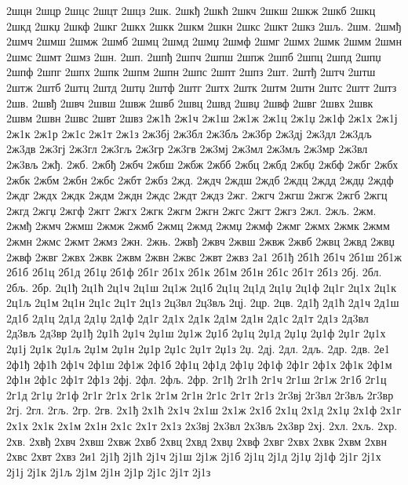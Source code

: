 {2шцн
2шцр
2шцс
2шцт
2шцз
2шк.
2шкђ
2шкћ
2шкч
2шкш
2шкж
2шкб
2шкц
2шкд
2шкџ
2шкф
2шкг
2шкх
2шкк
2шкм
2шкн
2шкс
2шкт
2шкз
2шљ.
2шм.
2шмђ
2шмч
2шмш
2шмж
2шмб
2шмц
2шмд
2шмџ
2шмф
2шмг
2шмх
2шмк
2шмм
2шмн
2шмс
2шмт
2шмз
2шн.
2шп.
2шпђ
2шпч
2шпш
2шпж
2шпб
2шпц
2шпд
2шпџ
2шпф
2шпг
2шпх
2шпк
2шпм
2шпн
2шпс
2шпт
2шпз
2шт.
2штђ
2штч
2штш
2штж
2штб
2штц
2штд
2штџ
2штф
2штг
2штх
2штк
2штм
2штн
2штс
2штт
2штз
2шв.
2швђ
2швч
2швш
2швж
2швб
2швц
2швд
2швџ
2швф
2швг
2швх
2швк
2швм
2швн
2швс
2швт
2швз
2ж1ћ
2ж1ч
2ж1ш
2ж1ж
2ж1ц
2ж1џ
2ж1ф
2ж1х
2ж1ј
2ж1к
2ж1р
2ж1с
2ж1т
2ж1з
2ж3бј
2ж3бл
2ж3бљ
2ж3бр
2ж3дј
2ж3дл
2ж3дљ
2ж3дв
2ж3гј
2ж3гл
2ж3гљ
2ж3гр
2ж3гв
2ж3мј
2ж3мл
2ж3мљ
2ж3мр
2ж3вл
2ж3вљ
2жђ.
2жб.
2жбђ
2жбч
2жбш
2жбж
2жбб
2жбц
2жбд
2жбџ
2жбф
2жбг
2жбх
2жбк
2жбм
2жбн
2жбс
2жбт
2жбз
2жд.
2ждч
2ждш
2ждб
2ждц
2ждд
2ждџ
2ждф
2ждг
2ждх
2ждк
2ждм
2ждн
2ждс
2ждт
2ждз
2жг.
2жгч
2жгш
2жгж
2жгб
2жгц
2жгд
2жгџ
2жгф
2жгг
2жгх
2жгк
2жгм
2жгн
2жгс
2жгт
2жгз
2жл.
2жљ.
2жм.
2жмђ
2жмч
2жмш
2жмж
2жмб
2жмц
2жмд
2жмџ
2жмф
2жмг
2жмх
2жмк
2жмм
2жмн
2жмс
2жмт
2жмз
2жн.
2жњ.
2жвђ
2жвч
2жвш
2жвж
2жвб
2жвц
2жвд
2жвџ
2жвф
2жвг
2жвх
2жвк
2жвм
2жвн
2жвс
2жвт
2жвз
2а1
2б1ђ
2б1ћ
2б1ч
2б1ш
2б1ж
2б1б
2б1ц
2б1д
2б1џ
2б1ф
2б1г
2б1х
2б1к
2б1м
2б1н
2б1с
2б1т
2б1з
2бј.
2бл.
2бљ.
2бр.
2ц1ђ
2ц1ћ
2ц1ч
2ц1ш
2ц1ж
2ц1б
2ц1ц
2ц1д
2ц1џ
2ц1ф
2ц1г
2ц1х
2ц1к
2ц1љ
2ц1м
2ц1н
2ц1с
2ц1т
2ц1з
2ц3вл
2ц3вљ
2цј.
2цр.
2цв.
2д1ђ
2д1ћ
2д1ч
2д1ш
2д1б
2д1ц
2д1д
2д1џ
2д1ф
2д1г
2д1х
2д1к
2д1м
2д1н
2д1с
2д1т
2д1з
2д3вл
2д3вљ
2д3вр
2џ1ђ
2џ1ћ
2џ1ч
2џ1ш
2џ1ж
2џ1б
2џ1ц
2џ1д
2џ1џ
2џ1ф
2џ1г
2џ1х
2џ1ј
2џ1к
2џ1љ
2џ1м
2џ1н
2џ1р
2џ1с
2џ1т
2џ1з
2џ.
2дј.
2дл.
2дљ.
2др.
2дв.
2е1
2ф1ђ
2ф1ћ
2ф1ч
2ф1ш
2ф1ж
2ф1б
2ф1ц
2ф1д
2ф1џ
2ф1ф
2ф1г
2ф1х
2ф1к
2ф1м
2ф1н
2ф1с
2ф1т
2ф1з
2фј.
2фл.
2фљ.
2фр.
2г1ђ
2г1ћ
2г1ч
2г1ш
2г1ж
2г1б
2г1ц
2г1д
2г1џ
2г1ф
2г1г
2г1х
2г1к
2г1м
2г1н
2г1с
2г1т
2г1з
2г3вј
2г3вл
2г3вљ
2г3вр
2гј.
2гл.
2гљ.
2гр.
2гв.
2х1ђ
2х1ћ
2х1ч
2х1ш
2х1ж
2х1б
2х1ц
2х1д
2х1џ
2х1ф
2х1г
2х1х
2х1к
2х1м
2х1н
2х1с
2х1т
2х1з
2х3вј
2х3вл
2х3вљ
2х3вр
2хј.
2хл.
2хљ.
2хр.
2хв.
2хвђ
2хвч
2хвш
2хвж
2хвб
2хвц
2хвд
2хвџ
2хвф
2хвг
2хвх
2хвк
2хвм
2хвн
2хвс
2хвт
2хвз
2и1
2ј1ђ
2ј1ћ
2ј1ч
2ј1ш
2ј1ж
2ј1б
2ј1ц
2ј1д
2ј1џ
2ј1ф
2ј1г
2ј1х
2ј1ј
2ј1к
2ј1љ
2ј1м
2ј1н
2ј1р
2ј1с
2ј1т
2ј1з
}
